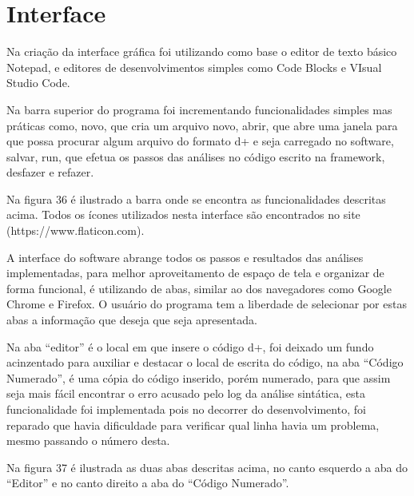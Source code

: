 \documentclass[12pt,oneside,a4paper,chapter=TITLE,section=TITLE,sumario=tradicional]{abntex2}
\begin{document}
\section{Interface}
\label{sec:interface}

Na criação da interface gráfica foi utilizando como base o editor de texto básico Notepad, e editores de desenvolvimentos simples como Code Blocks e VIsual Studio Code. 

Na barra superior do programa foi incrementando funcionalidades simples mas práticas como, novo, que cria um arquivo novo, abrir, que abre uma janela para que possa procurar algum arquivo do formato d+ e seja carregado no software, salvar, run, que efetua os passos das análises no código escrito na framework, desfazer e refazer. 

Na figura 36 é ilustrado a barra onde se encontra as funcionalidades descritas acima. Todos os ícones utilizados nesta interface são encontrados no site (https://www.flaticon.com).

\begin{figure}[htb]
\end{figure} 

A interface do software abrange todos os passos e resultados das análises implementadas, para melhor aproveitamento de espaço de tela e organizar de forma funcional, é utilizando de abas, similar ao dos navegadores como Google Chrome e Firefox. O usuário do programa tem a liberdade de selecionar por estas abas a informação que deseja que seja apresentada. 

Na aba “editor” é o local em que insere o código d+, foi deixado um fundo acinzentado para auxiliar e destacar o local de escrita do código, na aba “Código Numerado”, é uma cópia do código inserido, porém numerado, para que assim seja mais fácil encontrar o erro acusado pelo log da análise sintática, esta funcionalidade foi implementada pois no decorrer do desenvolvimento, foi reparado que havia dificuldade para verificar qual linha havia um problema, mesmo passando o número desta. 

Na figura 37 é ilustrada as duas abas descritas acima, no canto esquerdo a aba do “Editor” e no canto direito a aba do “Código Numerado”. 

\begin{figure}[htb]
\end{figure}
\end{document}
